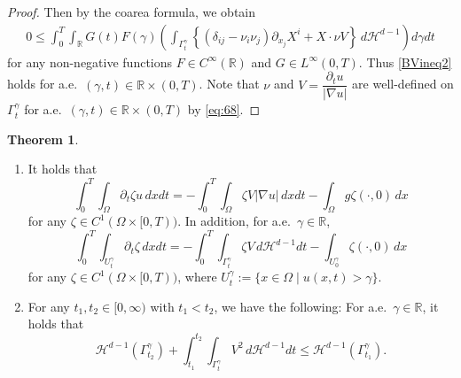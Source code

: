 \documentclass{amsart}
\theoremstyle{definition}
\newtheorem{theorem}[definition]{Theorem}
\def\R{{\mathbb{R}}}
\begin{document}
\begin{proof}
Then by the coarea formula, we obtain
\begin{equation}\label{BVineq5}
\begin{split}
0\leq  
\int_0 ^T 
\int_\R G (t) F (\gamma) \left(
\int_{\Gamma_t ^\gamma} \left\{ \left( \delta_{ij} - \nu_i \nu_j \right)
\partial_{x_j} X^i 
+ X \cdot \nu V
\right\}  \, d\mathcal{H}^{d-1} \right) d\gamma dt
\end{split}
\end{equation}
for any non-negative functions
$F \in C^\infty (\R)$ and
$G \in L^\infty (0,T)$.
Thus \eqref{BVineq2} holds for a.e.\ $(\gamma,t) \in \R \times (0,T)$. Note that $\nu$ and $V=\dfrac{\partial _t u}{|\nabla u|}$ are well-defined on $\Gamma_t ^\gamma$ for a.e.\ $(\gamma,t) \in \R \times (0,T)$ by \eqref{eq:68}.
\end{proof}

\begin{theorem}\label{thm:3.8}
\begin{enumerate}
\item[(i)]
It holds that
\begin{equation}\label{eq:75}
\int_0 ^T \int_\Omega
\partial_t \zeta u \, dxdt
= 
-\int_0 ^T \int_\Omega \zeta V |\nabla u| \, dxdt
- \int_\Omega g \zeta (\cdot,0) \, dx
\end{equation}
for any $\zeta \in C ^1 (\Omega \times [0,T))$.
In addition, for a.e.\ $\gamma \in \R$, 
\begin{equation}\label{eq:77}
\int_0 ^T \int_{U_t ^\gamma}
\partial_t \zeta \, dxdt
= 
-\int_0 ^T \int_{\Gamma_t ^\gamma} \zeta V  \, d\mathcal{H}^{d-1} dt
- \int_{U_0 ^\gamma} \zeta (\cdot,0) \, dx
\end{equation}
for any $\zeta \in C ^1 (\Omega \times [0,T))$, where
$U_t ^\gamma := \{ x \in \Omega \mid u(x,t) >\gamma \}$.
\item[(ii)]
For any $t_1,t_2 \in [0,\infty)$ with $t_1 <t_2$, we have the following: For a.e.\ $\gamma \in \R$, it holds that
\begin{equation}\label{energy-ineq2}
\mathcal{H}^{d-1} (\Gamma_{t_2} ^\gamma) 
+
\int_{t_1} ^{t_2} 
\int_{\Gamma_t ^\gamma} V^2 \, d\mathcal{H}^{d-1} dt
\leq 
\mathcal{H}^{d-1} (\Gamma_{t_1} ^\gamma) .
\end{equation}
\end{enumerate}
\end{theorem}
\end{document}
